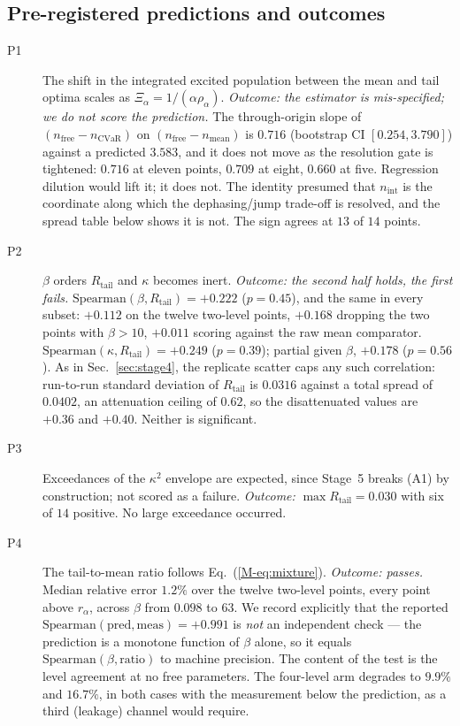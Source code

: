 \documentclass[aps,pra,onecolumn,notitlepage,superscriptaddress,nofootinbib,floatfix]{revtex4-2}
\newcommand{\cvar}{\mathrm{CVaR}}
\newcommand{\Rt}{R_{\mathrm{tail}}}
\begin{document}
\subsection{Pre-registered predictions and outcomes}
\begin{description}
\item[P1] The shift in the integrated excited population between the mean and
tail optima scales as $\Xi_\alpha=1/(\alpha\rho_\alpha)$.
\emph{Outcome: the estimator is mis-specified; we do not score the
prediction.} The through-origin slope of
$(n_{\mathrm{free}}-n_{\cvar})$ on $(n_{\mathrm{free}}-n_{\mathrm{mean}})$ is
$0.716$ (bootstrap CI $[0.254,3.790]$) against a predicted $3.583$, and it does
not move as the resolution gate is tightened: $0.716$ at eleven points, $0.709$
at eight, $0.660$ at five. Regression dilution would lift it; it does not.
The identity presumed that $n_{\mathrm{int}}$ is the coordinate along which the
dephasing/jump trade-off is resolved, and the spread table below shows it is
not. The sign agrees at $13$ of $14$ points.
\item[P2] $\beta$ orders $\Rt$ and $\kappa$ becomes inert.
\emph{Outcome: the second half holds, the first fails.}
$\mathrm{Spearman}(\beta,\Rt)=+0.222$ ($p=0.45$), and the same in every
subset: $+0.112$ on the twelve two-level points, $+0.168$ dropping the two
points with $\beta>10$, $+0.011$ scoring against the raw mean comparator.
$\mathrm{Spearman}(\kappa,\Rt)=+0.249$ ($p=0.39$); partial given $\beta$,
$+0.178$ ($p=0.56$). As in Sec.~\ref{sec:stage4}, the replicate scatter caps
any such correlation: run-to-run standard deviation of $\Rt$ is $0.0316$
against a total spread of $0.0402$, an attenuation ceiling of $0.62$, so the
disattenuated values are $+0.36$ and $+0.40$. Neither is significant.
\item[P3] Exceedances of the $\kappa^2$ envelope are expected, since Stage~5
breaks (A1) by construction; not scored as a failure. \emph{Outcome:}
$\max\Rt=0.030$ with six of $14$ positive. No large exceedance occurred.
\item[P4] The tail-to-mean ratio follows Eq.~(\ref{M-eq:mixture}).
\emph{Outcome: passes.} Median relative error $1.2\%$ over the twelve
two-level points, every point above $r_\alpha$, across $\beta$ from $0.098$ to
$63$. We record explicitly that the reported
$\mathrm{Spearman}(\text{pred},\text{meas})=+0.991$ is \emph{not} an
independent check --- the prediction is a monotone function of $\beta$ alone,
so it equals $\mathrm{Spearman}(\beta,\text{ratio})$ to machine precision. The
content of the test is the level agreement at no free parameters. The
four-level arm degrades to $9.9\%$ and $16.7\%$, in both cases with the
measurement below the prediction, as a third (leakage) channel would require.
\end{description}
\end{document}
